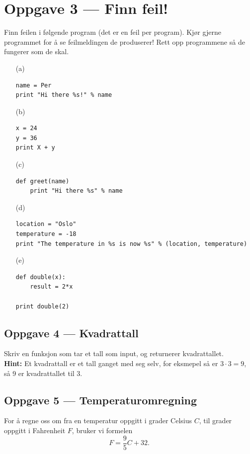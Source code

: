 \documentclass[a4paper, 11pt, notitlepage]{article}
\begin{document}
\section*{Oppgave 3 --- Finn feil!}
Finn feilen i følgende program (det er en feil per program). Kjør gjerne programmet for å se feilmeldingen de produserer! Rett opp programmene så de fungerer som de skal.
\begin{itemize}
	\item[(a)] 
\begin{lstlisting}
name = Per 
print "Hi there %s!" % name
\end{lstlisting}

\item[(b)] 
\begin{lstlisting}
x = 24
y = 36
print X + y
\end{lstlisting}

\item[(c)] 
\begin{lstlisting}
def greet(name)
	print "Hi there %s" % name
\end{lstlisting}

\item[(d)] 
\begin{lstlisting}
location = "Oslo"
temperature = -18
print "The temperature in %s is now %s" % (location, temperature)
\end{lstlisting}

\item[(e)] 
\begin{lstlisting}
def double(x):
	result = 2*x

print double(2)
\end{lstlisting}
\end{itemize}

\subsection*{Oppgave 4 --- Kvadrattall}
Skriv en funksjon som tar et tall som input, og returnerer kvadrattallet. \\ \textbf{Hint:} Et kvadrattall er et tall ganget med seg selv, for eksmepel så er $3\cdot 3 = 9$, så 9 er kvadrattallet til 3.

\subsection*{Oppgave 5 --- Temperaturomregning}
For å regne oss om fra en temperatur oppgitt i grader Celsius $C$, til grader oppgitt i Fahrenheit $F$, bruker vi formelen
$$F = \frac{9}{5}C + 32.$$
\end{document}
